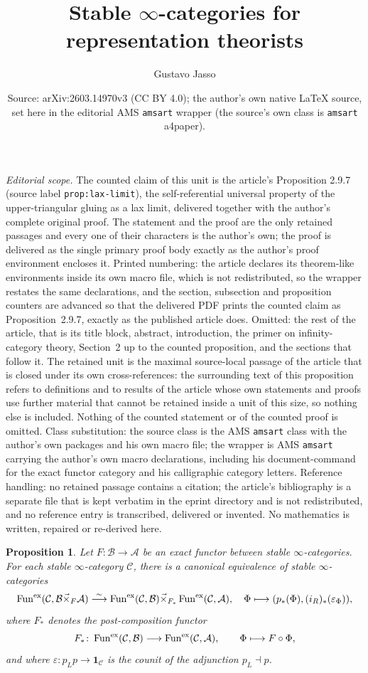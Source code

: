 \documentclass[10pt,a4paper]{amsart}
\title{Stable $\infty$-categories for representation theorists}
\author{Gustavo Jasso}
\date{Source: arXiv:2603.14970v3 (CC BY 4.0); the author's own native \LaTeX{} source, set here in the editorial AMS \texttt{amsart} wrapper (the source's own class is \texttt{amsart} a4paper).}
\newcommand{\category}[1]{\mathcal{#1}}
\newcommand{\A}{\category{A}}
\newcommand{\B}{\category{B}}
\newcommand{\C}{\category{C}}
\theoremstyle{plain}
\newtheorem{proposition}{Proposition}[subsection]
\theoremstyle{definition}
\theoremstyle{remark}
\begin{document}
\maketitle
\noindent\textit{Editorial scope.} The counted claim of this unit is the article's Proposition 2.9.7 (source label \texttt{prop:lax-limit}), the self-referential universal property of the upper-triangular gluing as a lax limit, delivered together with the author's complete original proof. The statement and the proof are the only retained passages and every one of their characters is the author's own; the proof is delivered as the single primary proof body exactly as the author's proof environment encloses it. Printed numbering: the article declares its theorem-like environments inside its own macro file, which is not redistributed, so the wrapper restates the same declarations, and the section, subsection and proposition counters are advanced so that the delivered PDF prints the counted claim as Proposition~2.9.7, exactly as the published article does. Omitted: the rest of the article, that is its title block, abstract, introduction, the primer on infinity-category theory, Section~2 up to the counted proposition, and the sections that follow it. The retained unit is the maximal source-local passage of the article that is closed under its own cross-references: the surrounding text of this proposition refers to definitions and to results of the article whose own statements and proofs use further material that cannot be retained inside a unit of this size, so nothing else is included. Nothing of the counted statement or of the counted proof is omitted. Class substitution: the source class is the AMS \texttt{amsart} class with the author's own packages and his own macro file; the wrapper is AMS \texttt{amsart} carrying the author's own macro declarations, including his document-command for the exact functor category and his calligraphic category letters. Reference handling: no retained passage contains a citation; the article's bibliography is a separate file that is kept verbatim in the eprint directory and is not redistributed, and no reference entry is transcribed, delivered or invented. No mathematics is written, repaired or re-derived here.

\setcounter{section}{2}
\setcounter{subsection}{9}
\setcounter{proposition}{6}
\begin{proposition}
  \label{prop:lax-limit}
  Let $F\colon\B\to\A$ be an exact functor between stable $\infty$-categories.  For each stable $\infty$-category $\C$, there is a canonical equivalence of
  stable $\infty$-categories
  \[
    \Fun<ex>{\C}{\B\vec{\times}_F\A}\stackrel{\sim}{\longrightarrow}\Fun<ex>{\C}{\B}\vec{\times}_{F_*}\Fun<ex>{\C}{\A},\quad\Phi\longmapsto(p_*(\Phi),(i_R)_*(\varepsilon_\Phi)),
  \]
  where $F_*$ denotes the post-composition functor
  \[
    F_*\colon\Fun<ex>{\C}{\B}\longrightarrow\Fun<ex>{\C}{\A},\qquad
    \Phi\longmapsto F\circ\Phi,
  \]
  and where $\varepsilon\colon p_Lp\to\mathbf{1}_{\C}$ is the counit of the adjunction
  $p_L\dashv p$.
\end{proposition}
\end{document}
